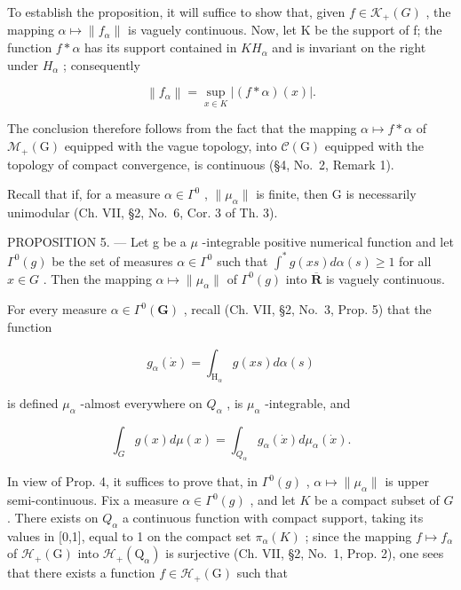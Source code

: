 To establish the proposition, it will suffice to show that, given \(f \in \mathcal{K}_{+}(G)\) , the mapping \(\alpha \mapsto \|f_{\alpha}\|\) is vaguely continuous. Now, let K be the support of f; the function \(f * \alpha\) has its support contained in \(KH_{\alpha}\) and is invariant on the right under \(H_{\alpha}\) ; consequently

\[
\left\| f _ {\alpha} \right\| = \sup _ {x \in K} | (f * \alpha) (x) |.
\]

The conclusion therefore follows from the fact that the mapping \(\alpha\mapsto f*\alpha\) of \(\mathcal{M}_{+}(\mathrm{G})\) equipped with the vague topology, into \(\mathcal{C}(\mathrm{G})\) equipped with the topology of compact convergence, is continuous (§4, No.~2, Remark 1).

Recall that if, for a measure \(\alpha \in \Gamma^0\) , \(\| \mu_{\alpha}\|\) is finite, then G is necessarily unimodular (Ch. VII, §2, No.~6, Cor. 3 of Th. 3).

PROPOSITION 5. --- Let g be a \(\mu\) -integrable positive numerical function and let \(\Gamma^{0}(g)\) be the set of measures \(\alpha\in\Gamma^{0}\) such that \(\int^{*}g(xs)d\alpha(s)\geqslant1\) for all \(x\in G\) . Then the mapping \(\alpha\mapsto\|\mu_{\alpha}\|\) of \(\Gamma^{0}(g)\) into \(\overline{\mathbf{R}}\) is vaguely continuous.

For every measure \(\alpha \in \Gamma^0 (\mathbf{G})\) , recall (Ch. VII, §2, No.~3, Prop. 5) that the function

\[
g _ {\alpha} (\dot {x}) = \int_ {\mathrm{H} _ {\alpha}} g (x s) d \alpha (s)
\]

is defined \(\mu_{\alpha}\) -almost everywhere on \(Q_{\alpha}\) , is \(\mu_{\alpha}\) -integrable, and

\[
\int_ {G} g (x) d \mu (x) = \int_ {Q _ {\alpha}} g _ {\alpha} (\dot {x}) d \mu_ {\alpha} (\dot {x}).\tag{4}
\]

In view of Prop. 4, it suffices to prove that, in \(\Gamma^0(g)\) , \(\alpha \mapsto \| \mu_\alpha \|\) is upper semi-continuous. Fix a measure \(\alpha \in \Gamma^0(g)\) , and let \(K\) be a compact subset of \(G\) . There exists on \(Q_\alpha\) a continuous function with compact support, taking its values in {[}0,1{]}, equal to 1 on the compact set \(\pi_\alpha(K)\) ; since the mapping \(f \mapsto f_\alpha\) of \(\mathcal{H}_+(\mathrm{G})\) into \(\mathcal{H}_+(\mathrm{Q}_\alpha)\) is surjective (Ch. VII, §2, No.~1, Prop. 2), one sees that there exists a function \(f \in \mathcal{H}_+(\mathrm{G})\) such that


